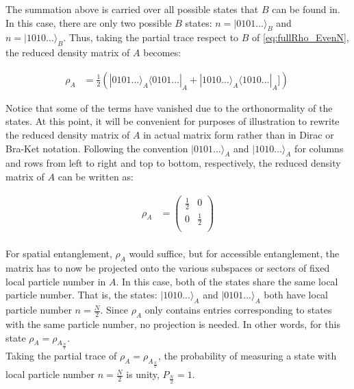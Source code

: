 \begin{samepage}
The summation above is carried over all possible states that $B$ can be found in. In this case, there are only two possible $B$ states: $n = |0101...\rangle_{B}$ and $n = |1010...\rangle_{B} $. Thus, taking the partial trace respect to $B$ of \ref{eq:fullRho_EvenN}, the reduced density matrix of $A$ becomes:

\begin{equation}
\begin{aligned}
\rho_{A} &= \frac{1}{2} ( | 0101... \rangle_{A} \langle 0101... |_{A} +  | 1010... \rangle_{A} \langle 1010... |_{A} ])\
\end{aligned}
\end{equation}

Notice that some of the terms have vanished due to the orthonormality of the states. At this point, it will be convenient for purposes of illustration to rewrite the reduced density matrix of $A$ in actual matrix form rather than in Dirac or Bra-Ket notation. Following the convention $|0101\dots\rangle_{A}$ and $|1010\dots\rangle_{A}$ for columns and rows from left to right and top to bottom, respectively, the reduced density matrix of $A$ can be written as:

\begin{equation}
\begin{aligned}
\rho_{A} &= \begin{pmatrix}
\frac{1}{2} & 0 \\
0 & \frac{1}{2} \\
\end{pmatrix} \\
\end{aligned}
\end{equation}

For spatial entanglement, $\rho_{A}$ would suffice, but for accessible entanglement, the matrix has to now be projected onto the various subspaces or sectors of fixed local particle number in $A$. In this case, both of the states share the same local particle number. That is, the states: $|1010...\rangle_{A}$ and $|0101...\rangle_{A}$ both have local particle number $n = \frac{N}{2}$. Since $\rho_{A}$ only contains entries corresponding to states with the same particle number, no projection is needed. In other words, for this state $\rho_{A} = \rho_{A_{\frac{N}{2}}}$. \\

Taking the partial trace of $\rho_{A} = \rho_{A_{\frac{N}{2}}}$, the probability of measuring a state with local particle number $n = \frac{N}{2} $ is unity, $P_{\frac{N}{2}}=1$.


\end{samepage}
